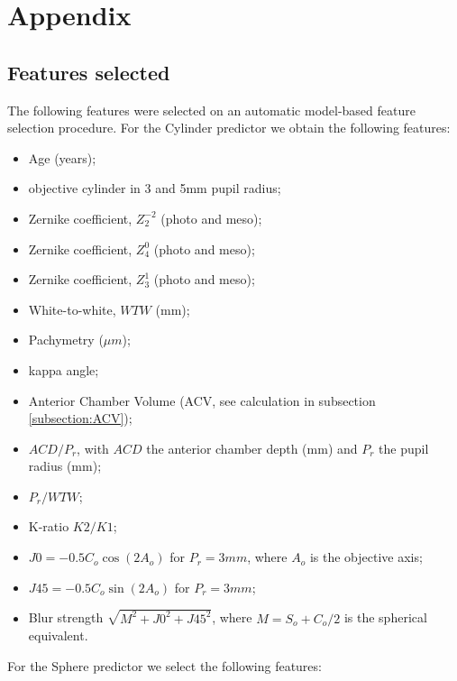 \documentclass[article,twocolumn,preprint,10pt]{paper}%
\renewcommand{\(}{\left(}
\renewcommand{\)}{\right)}
\renewcommand{\[}{\left[}
\renewcommand{\]}{\right]}
\newcommand{\1}{\mbox{\boldmath$1$}}
\begin{document}
	\section{Appendix}
	\subsection{Features selected}\label{subsection:featuresSelected}
	The following features were selected on an automatic model-based feature selection procedure. 
	For the Cylinder predictor we obtain the following features: 
	\begin{itemize}
		\item Age (years);
		\item objective cylinder in 3 and 5mm pupil radius;
		\item Zernike coefficient, $Z_2^{-2}$ (photo and meso);
		\item Zernike coefficient, $Z_4^0$ (photo and meso);  
		\item Zernike coefficient, $Z_3^1$ (photo and meso);
		\item White-to-white, $WTW$ (mm);
		\item Pachymetry ($\mu m$);
		\item kappa angle;
		\item Anterior Chamber Volume (ACV, see calculation in  subsection \ref{subsection:ACV});
		\item $ACD/P_r$, with $ACD$ the anterior chamber depth (mm) and $P_r$ the pupil radius (mm);
		\item  $P_r/WTW$;
		\item K-ratio $K2/K1$;
		\item $J0=-0.5C_o\cos(2A_o) $ for $P_r= 3mm$, where $A_o$ is the objective axis;
		\item $J45=-0.5C_o\sin(2A_o)$ for $P_r= 3mm$;
		\item Blur strength $\sqrt{M^2+J0^2 +J45^2}$, where $M= S_o+C_o/2$ is the spherical equivalent.
	\end{itemize}
	For the Sphere predictor we select the following features:
\end{document}
